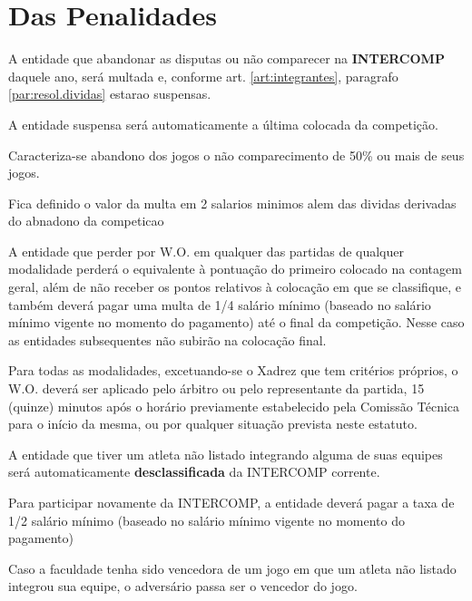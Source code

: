 {\let\clearpage\relax \chapter{Das Penalidades}}

\begin{article}
	A entidade que abandonar as disputas ou não comparecer na \textbf{INTERCOMP} daquele ano, será multada e, conforme art. \ref{art:integrantes}, paragrafo \ref{par:resol.dividas} estarao suspensas.

	\begin{xparagraph}
		A entidade suspensa será automaticamente a última colocada da competição.
	\end{xparagraph}

	\begin{xparagraph}
		Caracteriza-se abandono dos jogos o não comparecimento de 50\% ou mais de seus jogos.
	\end{xparagraph}

	\begin{xparagraph}
		Fica definido o valor da multa em 2 salarios minimos alem das dividas derivadas do abnadono da competicao
	\end{xparagraph}
\end{article}

\begin{article}
	A entidade que perder por W.O. em qualquer das partidas de qualquer modalidade perderá o equivalente à pontuação do primeiro colocado na contagem geral, além de não receber os pontos relativos à colocação em que se classifique, e também deverá pagar uma multa de 1/4 salário mínimo (baseado no salário mínimo vigente no momento do pagamento) até o final da competição. Nesse caso as entidades subsequentes não subirão na colocação final.

	\begin{xparagraph}
		Para todas as modalidades, excetuando-se o Xadrez que tem critérios próprios, o W.O. deverá ser aplicado pelo árbitro ou pelo representante da partida, 15 (quinze) minutos após o horário previamente estabelecido pela Comissão Técnica para o início da mesma, ou por qualquer situação prevista neste estatuto.
	\end{xparagraph}
\end{article}

\begin{article}
	A entidade que tiver um atleta não listado integrando alguma de suas equipes será automaticamente \textbf{desclassificada} da INTERCOMP corrente.

	\begin{xparagraph}
		Para participar novamente da INTERCOMP, a entidade deverá pagar a taxa de 1/2 salário mínimo (baseado no salário mínimo vigente no momento do pagamento)
	\end{xparagraph}

	\begin{xparagraph}
		Caso a faculdade tenha sido vencedora de um jogo em que um atleta não listado integrou sua equipe, o adversário passa ser o vencedor do jogo.
	\end{xparagraph}
\end{article}

